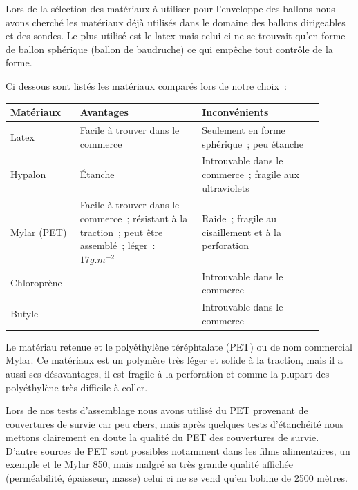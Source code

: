 \documentclass[a4paper,11pt]{article}
\begin{document}
Lors de la sélection des matériaux à utiliser pour l'enveloppe des ballons nous avons cherché les matériaux déjà utilisés dans le domaine des ballons dirigeables et des sondes. Le plus utilisé est le latex mais celui ci ne se trouvait qu'en forme de ballon sphérique (ballon de baudruche) ce qui empêche tout contrôle de la forme.

Ci dessous sont listés les matériaux comparés lors de notre choix~:

\begin{center}
\begin{tabular}{|p{0.2\linewidth}|p{0.35\linewidth}|p{0.35\linewidth}|}
		\hline
		Matériaux & Avantages & Inconvénients \\
		\hline

		\rowcolor{OrangeT}
		Latex &
		Facile à trouver dans le commerce &
		Seulement en forme sphérique~; peu étanche \\
		\hline

		\rowcolor{RedT}
		Hypalon & Étanche & Introuvable dans le commerce~; fragile aux ultraviolets \\
		\hline

		\rowcolor{GreenT}
		Mylar (PET) &
		Facile à trouver dans le commerce~; résistant à la traction~; peut être assemblé~; léger~: $17 g.m^{-2}$ &
		Raide~; fragile au cisaillement et à la perforation \\
		\hline

		\rowcolor{RedT}
		Chloroprène &
		& Introuvable dans le commerce \\
		\hline

		\rowcolor{RedT}
		Butyle &
		& Introuvable dans le commerce \\
		\hline
\end{tabular}
\end{center}

Le matériau retenue et le polyéthylène téréphtalate (PET) ou de nom commercial Mylar. Ce matériaux est un polymère très léger et solide à la traction, mais il a aussi ses désavantages, il est fragile à la perforation et comme la plupart des polyéthylène très difficile à coller.

Lors de nos tests d'assemblage nous avons utilisé du PET provenant de couvertures de survie car peu chers, mais après quelques tests d'étanchéité nous mettons clairement en doute la qualité du PET des couvertures de survie. D'autre sources de PET sont possibles notamment dans les films alimentaires, un exemple et le Mylar 850, mais malgré sa très grande qualité affichée (perméabilité, épaisseur, masse) celui ci ne se vend qu'en bobine de 2500 mètres.
\end{document}
